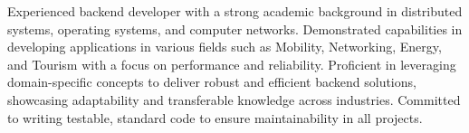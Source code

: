 \par{
    Experienced backend developer with a strong academic background in distributed systems, operating systems, and computer networks. Demonstrated capabilities in developing applications in various fields such as Mobility, Networking, Energy, and Tourism with a focus on performance and reliability. Proficient in leveraging domain-specific concepts to deliver robust and efficient backend solutions, showcasing adaptability and transferable knowledge across industries. Committed to writing testable, standard code to ensure maintainability in all projects.
}